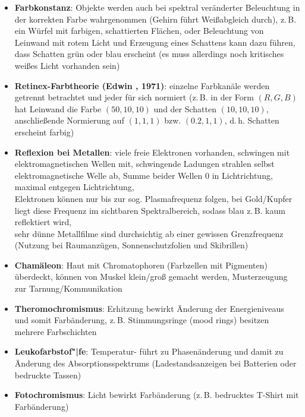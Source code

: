 \begin{itemize}
    \item
    \textbf{Farbkonstanz}:
    Objekte werden auch bei spektral veränderter Beleuchtung in der korrekten
    Farbe wahrgenommen (Gehirn führt Weißabgleich durch), z.\,B.
    ein Würfel mit farbigen, schattierten Flächen,
    oder Beleuchtung von Leinwand mit rotem Licht und Erzeugung eines
    Schattens kann dazu führen, dass Schatten grün oder blau erscheint
    (es muss allerdings noch kritisches weißes Licht vorhanden sein)
    
    \item
    \textbf{Retinex-Farbtheorie (Edwin , 1971)}:
    einzelne Farbkanäle werden getrennt betrachtet und jeder für sich normiert
    (z.\,B. in der Form $(R, G, B)$ hat Leinwand die Farbe $(50, 10, 10)$ und
    der Schatten $(10, 10, 10)$, anschließende Normierung auf
    $(1, 1, 1)$ bzw. $(0.2, 1, 1)$, d.\,h. Schatten erscheint farbig)
\end{itemize}
\linie
\begin{itemize}
    \item
    \textbf{Reflexion bei Metallen}:
    viele freie Elektronen vorhanden, schwingen mit elektromagnetischen
    Wellen mit, schwingende Ladungen strahlen selbst elektromagnetische
    Welle ab, Summe beider Wellen $0$ in Lichtrichtung, maximal entgegen
    Lichtrichtung, \\
    Elektronen können nur bis zur sog. Plasmafrequenz folgen, bei Gold/Kupfer
    liegt diese Frequenz im sichtbaren Spektralbereich, sodass blau z.\,B.
    kaum reflektiert wird, \\
    sehr dünne Metallfilme sind durchsichtig ab einer gewissen Grenzfrequenz
    (Nutzung bei Raumanzügen, Sonnenschutzfolien und Skibrillen)
\end{itemize}
\linie
\begin{itemize}
    \item
    \textbf{Chamäleon}:
    Haut mit Chromatophoren (Farbzellen mit Pigmenten) überdeckt,
    können von Muskel klein/groß gemacht werden, Musterzeugung zur
    Tarnung/Kommunikation
    
    \item
    \textbf{Theromochromismus}:
    Erhitzung bewirkt Änderung der Energieniveaus und somit Farbänderung,
    z.\,B. Stimmungsringe (mood rings) besitzen mehrere Farbschichten
    
    \item
    \textbf{Leukofarbstof"|fe}:
    Temperatur- führt zu Phasenänderung und damit zu Änderung des
    Absorptionsspektrums (Ladestandsanzeigen bei Batterien
    oder bedruckte Tassen)
    
    \item
    \textbf{Fotochromismus}:
    Licht bewirkt Farbänderung (z.\,B. bedrucktes T-Shirt mit Farbänderung)
\end{itemize}

